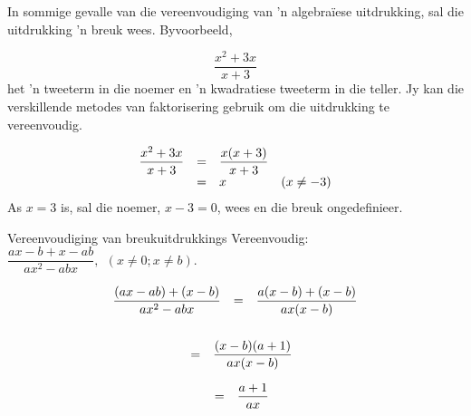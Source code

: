 In sommige gevalle van die vereenvoudiging van ’n algebraïese uitdrukking, sal die uitdrukking ’n breuk wees. Byvoorbeeld,

\begin{equation*}
\dfrac{{x}^{2}+3x}{x+3}
\end{equation*}
het ’n tweeterm in die noemer en ’n kwadratiese tweeterm in die teller. Jy kan die verskillende metodes van faktorisering gebruik om die uitdrukking te vereenvoudig.\par 

\begin{equation*}
\begin{array}{llll} \dfrac{{x}^{2}+3x}{x+3}\hfill & =& \dfrac{x(x+3)}{x+3}\hfill & \\ & =& x\hfill & (x\neq -3)\hfill \end{array}
\end{equation*}
As $x = 3$ is, sal die noemer, $x-3 = 0$, wees en die breuk ongedefinieer.



\begin{wex}{Vereenvoudiging van breukuitdrukkings }{Vereenvoudig: $\dfrac{ax-b+x-ab}{a{x}^{2}-abx}, ~~(x \neq 0;x \neq b)$.}
{
\begin{equation*}
\begin{array}{lll}\dfrac{(ax-ab)+(x-b)}{a{x}^{2}-abx}\hfill & =& \dfrac{a(x-b)+(x-b)}{ax(x-b)}\hfill \\ \end{array}
\end{equation*}
\begin{equation*}
\begin{array}{lll}
\\& =& \dfrac{(x-b)(a+1)}{ax(x-b)}\hfill \end{array}
\end{equation*}

\begin{equation*}
\begin{array}{ccc}& =& \dfrac{a+1}{ax}\hfill \end{array}
\end{equation*}
}
\end{wex}


